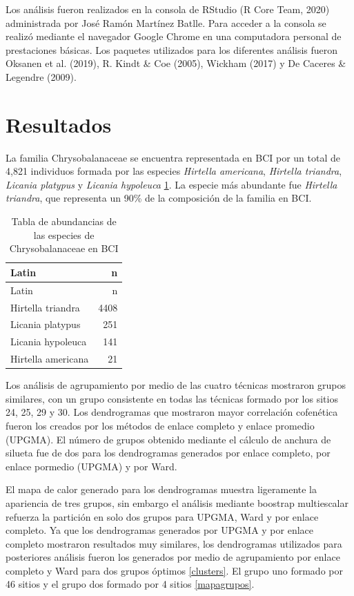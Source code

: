 \documentclass[11pt,]{article}
\begin{document}
Los análisis fueron realizados en la consola de RStudio (R Core Team,
2020) administrada por José Ramón Martínez Batlle. Para acceder a la
consola se realizó mediante el navegador Google Chrome en una
computadora personal de prestaciones básicas. Los paquetes utilizados
para los diferentes análisis fueron Oksanen et al. (2019), R. Kindt \&
Coe (2005), Wickham (2017) y De Caceres \& Legendre (2009).

\section{Resultados}\label{resultados}

La familia Chrysobalanaceae se encuentra representada en BCI por un
total de 4,821 individuos formada por las especies \emph{Hirtella
americana}, \emph{Hirtella triandra}, \emph{Licania platypus} y
\emph{Licania hypoleuca} \ref{tab:abun_sp}. La especie más abundante fue
\emph{Hirtella triandra}, que representa un 90\% de la composición de la
familia en BCI.

\begin{longtable}[]{@{}lr@{}}
\caption{\label{tab:abun_sp}Tabla de abundancias de las especies de
Chrysobalanaceae en BCI}\tabularnewline
\toprule
Latin & n\tabularnewline
\midrule
\endfirsthead
\toprule
Latin & n\tabularnewline
\midrule
\endhead
Hirtella triandra & 4408\tabularnewline
Licania platypus & 251\tabularnewline
Licania hypoleuca & 141\tabularnewline
Hirtella americana & 21\tabularnewline
\bottomrule
\end{longtable}

Los análisis de agrupamiento por medio de las cuatro técnicas mostraron
grupos similares, con un grupo consistente en todas las técnicas formado
por los sitios 24, 25, 29 y 30. Los dendrogramas que mostraron mayor
correlación cofenética fueron los creados por los métodos de enlace
completo y enlace promedio (UPGMA). El número de grupos obtenido
mediante el cálculo de anchura de silueta fue de dos para los
dendrogramas generados por enlace completo, por enlace pormedio (UPGMA)
y por Ward.

El mapa de calor generado para los dendrogramas muestra ligeramente la
apariencia de tres grupos, sin embargo el análisis mediante boostrap
multiescalar refuerza la partición en solo dos grupos para UPGMA, Ward y
por enlace completo. Ya que los dendrogramas generados por UPGMA y por
enlace completo mostraron resultados muy similares, los dendrogramas
utilizados para posteriores análisis fueron los generados por medio de
agrupamiento por enlace completo y Ward para dos grupos óptimos
\ref{clusters}. El grupo uno formado por 46 sitios y el grupo dos
formado por 4 sitios \ref{mapagrupos}.
\end{document}

